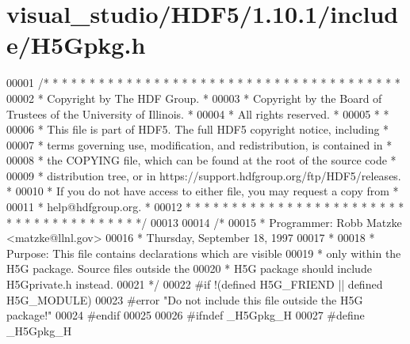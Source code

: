 \hypertarget{visual__studio_2_h_d_f5_21_810_81_2include_2_h5_gpkg_8h_source}{}\section{visual\+\_\+studio/\+H\+D\+F5/1.10.1/include/\+H5\+Gpkg.h}
\label{visual__studio_2_h_d_f5_21_810_81_2include_2_h5_gpkg_8h_source}

\begin{DoxyCode}
00001 \textcolor{comment}{/* * * * * * * * * * * * * * * * * * * * * * * * * * * * * * * * * * * * * * *}
00002 \textcolor{comment}{ * Copyright by The HDF Group.                                               *}
00003 \textcolor{comment}{ * Copyright by the Board of Trustees of the University of Illinois.         *}
00004 \textcolor{comment}{ * All rights reserved.                                                      *}
00005 \textcolor{comment}{ *                                                                           *}
00006 \textcolor{comment}{ * This file is part of HDF5.  The full HDF5 copyright notice, including     *}
00007 \textcolor{comment}{ * terms governing use, modification, and redistribution, is contained in    *}
00008 \textcolor{comment}{ * the COPYING file, which can be found at the root of the source code       *}
00009 \textcolor{comment}{ * distribution tree, or in https://support.hdfgroup.org/ftp/HDF5/releases.  *}
00010 \textcolor{comment}{ * If you do not have access to either file, you may request a copy from     *}
00011 \textcolor{comment}{ * help@hdfgroup.org.                                                        *}
00012 \textcolor{comment}{ * * * * * * * * * * * * * * * * * * * * * * * * * * * * * * * * * * * * * * */}
00013 
00014 \textcolor{comment}{/*}
00015 \textcolor{comment}{ * Programmer: Robb Matzke <matzke@llnl.gov>}
00016 \textcolor{comment}{ *             Thursday, September 18, 1997}
00017 \textcolor{comment}{ *}
00018 \textcolor{comment}{ * Purpose:     This file contains declarations which are visible}
00019 \textcolor{comment}{ *              only within the H5G package. Source files outside the}
00020 \textcolor{comment}{ *              H5G package should include H5Gprivate.h instead.}
00021 \textcolor{comment}{ */}
00022 \textcolor{preprocessor}{#if !(defined H5G\_FRIEND || defined H5G\_MODULE)}
00023 \textcolor{preprocessor}{#error "Do not include this file outside the H5G package!"}
00024 \textcolor{preprocessor}{#endif}
00025 
00026 \textcolor{preprocessor}{#ifndef \_H5Gpkg\_H}
00027 \textcolor{preprocessor}{#define \_H5Gpkg\_H}

\end{DoxyCode}
